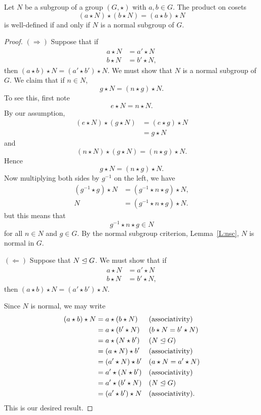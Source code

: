\documentclass{ximera}
\begin{document}
\begin{lemma}\label{L:cpwd}
  Let $N$ be a subgroup of a group $(G,\star)$ with $a,b\in G$.  The
  product on cosets
  \[
  (a\star N) \star (b\star N ) = (a\star b)\star N
  \]
  is well-defined if and only if $N$ is a normal subgroup of $G$.
  \begin{proof}
    $(\Rightarrow)$ Suppose that if
    \begin{align*}
      a\star N &= a'\star N\\
      b\star N &= b'\star N,
    \end{align*}
    then $(a\star b) \star N = (a'\star b')\star N$. We must show that
    $N$ is a normal subgroup of $G$. We claim that if $n\in N$,
    \[
    g \star N = (n\star g)\star N.
    \]
    To see this, first note
    \[
    e \star N = n \star N.
    \]
    By our assumption,
    \begin{align*}
    (e\star N) \star (g\star N) &= (e\star g)\star N \\
    &= g\star N
    \end{align*}
    and
    \[
    (n\star N) \star (g\star N) = (n\star g)\star N.
    \]
    Hence
    \[
    g\star N = (n\star g)\star N.
    \]
    Now multiplying both sides by $g^{-1}$ on the left, we have
    \begin{align*}
      (g^{-1}\star g)\star N &= (g^{-1} \star n\star g)\star N,\\
      N &= (g^{-1} \star n\star g)\star N.
    \end{align*}
    but this means that
    \[
    g^{-1} \star n\star g \in N
    \]
    for all $n\in N$ and $g\in G$. By the normal subgroup criterion,
    Lemma~\ref{L:nsc}, $N$ is normal in $G$.

    
    $(\Leftarrow)$ Suppose that $N\trianglelefteq G$. We must show that if
    \begin{align*}
      a\star N &= a'\star N\\
      b\star N &= b'\star N,
    \end{align*}
    then $(a\star b) \star N = (a'\star b')\star N$.


    Since $N$ is normal, we may write
    \begin{align*}
    (a\star b) \star N &= a\star(b\star N) & &\text{(associativity)}\\
    &= a\star ( b'\star N ) & &\text{($b\star N = b'\star N$)} \\
    &= a\star (N\star b') & &\text{($N\trianglelefteq G$)}\\
    &= (a\star N) \star b' & &\text{(associativity)}\\
    &= (a'\star N) \star b' & &\text{($a\star N = a'\star N$)} \\
    &= a' \star (N\star b') & &\text{(associativity)}\\
    &= a'\star (b'\star N) & &\text{($N\trianglelefteq G$)}\\
    &= (a'\star b')\star N & &\text{(associativity)}.
    \end{align*}
    This is our desired result.
  \end{proof}
\end{lemma}
\end{document}
